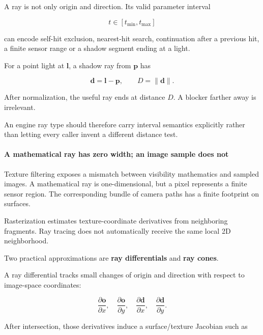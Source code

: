 \hypertarget{03-visual-computing-i-ch001-a-ray-query-includes-an-interval}{}

A ray is not only origin and direction. Its valid parameter interval

\[
t\in[t_{\min},t_{\max}]
\]

can encode self-hit exclusion, nearest-hit search, continuation after a previous hit, a finite sensor range or a shadow segment ending at a light.

For a point light at \(\mathbf l\), a shadow ray from \(\mathbf p\) has

\[
\mathbf d=\mathbf l-\mathbf p,
\qquad
D=\|\mathbf d\|.
\]

After normalization, the useful ray ends at distance \(D\). A blocker farther away is irrelevant.

An engine ray type should therefore carry interval semantics explicitly rather than letting every caller invent a different distance test.

\paragraph{A mathematical ray has zero width; an image sample does not}\label{03-visual-computing-i-ch001-a-mathematical-ray-has-zero-width-an-image-sample-does-not}

\hypertarget{03-visual-computing-i-ch001-a-mathematical-ray-has-zero-width-an-image-sample-does-not}{}

Texture filtering exposes a mismatch between visibility mathematics and sampled images. A mathematical ray is one-dimensional, but a pixel represents a finite sensor region. The corresponding bundle of camera paths has a finite footprint on surfaces.

Rasterization estimates texture-coordinate derivatives from neighboring fragments. Ray tracing does not automatically receive the same local 2D neighborhood.

Two practical approximations are \textbf{ray differentials} and \textbf{ray cones}.

A ray differential tracks small changes of origin and direction with respect to image-space coordinates:

\[
\frac{\partial \mathbf o}{\partial x},
\quad
\frac{\partial \mathbf o}{\partial y},
\quad
\frac{\partial \mathbf d}{\partial x},
\quad
\frac{\partial \mathbf d}{\partial y}.
\]

After intersection, those derivatives induce a surface/texture Jacobian such as

